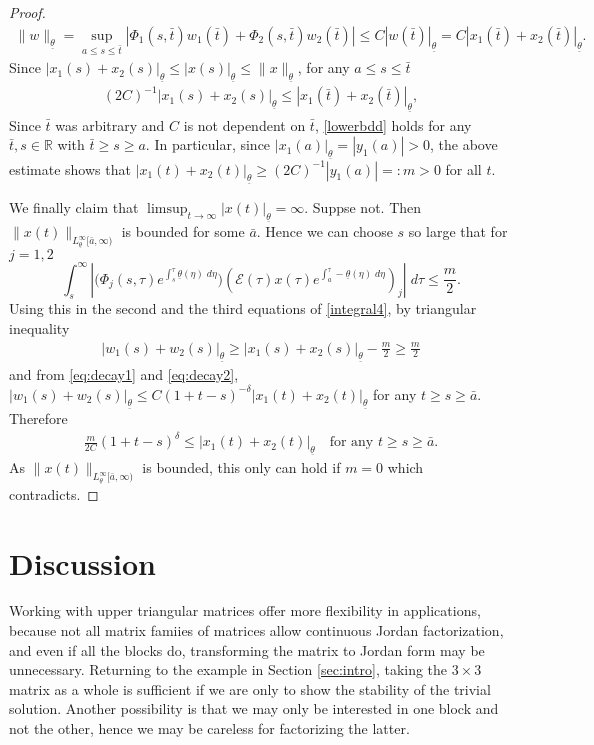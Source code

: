 \documentclass[a4paper,11pt]{article}
\newcommand{\tl}{{\underline{\theta}}}
\newcommand{\bt}{{\bar{t}}}
\newcommand{\E}{\mathcal{E}}
\theoremstyle{remark}
\begin{document}
\begin{proof}
\begin{align*}
\|w\|_\tl = \sup_{a\le s\le \bt} \left| \Phi_1(s,\bt)w_1(\bt) + \Phi_2(s,\bt)w_2(\bt)\right|\le C|w(\bt)|_\tl =C|x_1(\bt) + x_2(\bt)|_\tl.%
\end{align*}
Since $|x_1(s)+x_2(s)|_\tl \le |x(s)|_\tl \le \|x\|_\tl$, for any $a \le s\le \bt$ 
\begin{align} \label{lowerbdd}
(2C)^{-1} |x_1(s)+x_2(s)|_\tl \le |x_1(\bt) + x_2(\bt)|_\tl ,
\end{align}
Since $\bt$ was arbitrary and $C$ is not dependent on $\bt$, \eqref{lowerbdd} holds for any $\bt,s \in \mathbb{R}$ with $\bt\ge s\ge a$. In particular, since $|x_1(a)|_\tl=|y_1(a)| >0$, the above estimate shows that $|x_1(t)+x_2(t)|_\tl\ge (2C)^{-1}|y_1(a)|=:m>0 $ for all $t$.

We finally claim that $ \displaystyle\limsup_{t \rightarrow \infty} |x(t)|_\tl = \infty$. Suppse not. Then $ \|x(t)\|_{L^\infty_\tl[\bar a,\infty)}$ is bounded for some $\bar a$. Hence we can choose $s$ so large that for $j=1,2$
$$\int_s^\infty \left|\big(\Phi_j(s,\tau)e^{\int_s^\tau \tl(\eta) \; d\eta}\big) (\E(\tau)x(\tau)e^{\int_a^\tau -\tl(\eta) \; d\eta})_j \right| \; d\tau \le \frac{m}{2}.$$
Using this in the second and the third equations of \eqref{integral4}, by triangular inequality 
\begin{align*}
|w_1(s) + w_2(s)|_\tl \ge |x_1(s)+x_2(s)|_\tl - \frac{m}{2} \ge \frac{m}{2}
\end{align*}
and from \eqref{eq:decay1} and \eqref{eq:decay2}, $ |w_1(s) + w_2(s)|_\tl \le C (1+t-s)^{-\delta} |x_1(t)+x_2(t)|_\tl$ for any $t\ge s\ge \bar a$. Therefore
\begin{align*}
\frac{m}{2C}(1+t-s)^\delta \le |x_1(t)+x_2(t)|_\tl \quad \text{for any $t\ge s\ge \bar a$}.
\end{align*}
As $\|x(t)\|_{L^\infty_\tl[\bar a,\infty)}$ is bounded, this only can hold if $m=0$ which contradicts.
\end{proof}


\section{Discussion} \label{sec:discuss}
Working with upper triangular matrices offer more flexibility in applications, because not all matrix famiies of matrices allow continuous Jordan factorization, and even if all the blocks do, transforming the matrix to Jordan form may be unnecessary. Returning to the example in Section \ref{sec:intro}, taking the $3\times 3$ matrix as a whole is sufficient if we are only to show the stability of the trivial solution.  Another possibility is that we may only be interested in one block and not the other, hence we may be careless for factorizing the latter.
\end{document}
